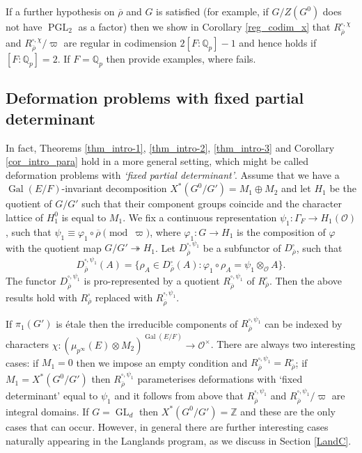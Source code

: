 \documentclass{amsart}
\theoremstyle{definition}
\theoremstyle{remark}
\DeclareMathOperator{\GL}{GL}
\DeclareMathOperator{\Gal}{Gal}
\newcommand{\Qp}{\mathbb {Q}_p}
\newcommand{\ZZ}{\mathbb Z}
\newcommand{\OO}{\mathcal O}
\newcommand{\rhobar}{\overline{\rho}}
\DeclareMathOperator{\PGL}{PGL}
\begin{document}
If a further hypothesis on $\rhobar$ and $G$ is satisfied (for example, 
if $G/Z(G^0)$ does not have $\PGL_2$ as a factor) then we show in 
Corollary \ref{reg_codim_x} that $R^{\square, \chi}_{\rhobar}$ and 
$R^{\square, \chi}_{\rhobar}/\varpi$ are regular in codimension $2[F:\Qp]-1$
and hence  holds if $[F:\Qp]=2$. If $F=\Qp$ then \cite[Remark 4.24, Corollary 4.25]{BIP_new} provide 
examples, where  fails. 


\subsection{Deformation problems with fixed partial determinant}\label{intro_partial}
In fact, Theorems \ref{thm_intro-1}, \ref{thm_intro-2}, \ref{thm_intro-3} and Corollary \ref{cor_intro_para} hold 
in a more general setting, which might be called deformation problems with \emph{`fixed partial determinant'}. Assume that we have 
a $\Gal(E/F)$-invariant decomposition $X^*(G^0/G')=M_1\oplus M_2$ and let $H_1$ be the quotient of $G/G'$ such that their  component
groups coincide and the character lattice of $H_1^0$ is equal to $M_1$. We fix a continuous representation $\psi_1: \Gamma_F \rightarrow H_1(\OO)$, 
such that $\psi_1 \equiv \varphi_1\circ \rhobar \pmod{\varpi}$, where $\varphi_1: G\rightarrow H_1$ is the composition
of $\varphi$ with the quotient map $G/G'\twoheadrightarrow H_1$. Let $D^{\square, \psi_1}_{\rhobar}$ be a subfunctor 
of $D^{\square}_{\rhobar}$, such that 
$$ D^{\square, \psi_1}_{\rhobar}(A)=\{ \rho_A\in D^{\square}_{\rhobar}(A): \varphi_1\circ \rho_A= \psi_1\otimes_{\OO} A\}.$$
The functor $D^{\square, \psi_1}_{\rhobar}$ is pro-represented by a quotient $R^{\square, \psi_1}_{\rhobar}$ of $R^{\square}_{\rhobar}$.
Then the above results hold with $R^{\square}_{\rhobar}$ replaced with $R^{\square, \psi_1}_{\rhobar}$. 


If $\pi_1(G')$ is \'etale then   
the irreducible components of $R^{\square, \psi_1}_{\rhobar}$ can be indexed by characters $\chi: (\mu_{p^{\infty}}(E)\otimes M_2)^{\Gal(E/F)} \rightarrow \OO^{\times}$. There are always two interesting cases: if $M_1=0$ then we impose an empty condition and $R^{\square, \psi_1}_{\rhobar}=R^{\square}_{\rhobar}$; 
if $M_1=X^*(G^0/G')$ then $R^{\square, \psi_1}_{\rhobar}$ parameterises deformations with `fixed determinant' equal to $\psi_1$ and it follows from above 
that $R^{\square, \psi_1}_{\rhobar}$ and $R^{\square, \psi_1}_{\rhobar}/\varpi$ are integral domains. If $G=\GL_d$ then $X^*(G^0/G')=\ZZ$ and these are
the only cases that can occur. However, in general there are further interesting cases naturally appearing in the Langlands program, as we discuss 
in Section \ref{LandC}.
\end{document}
